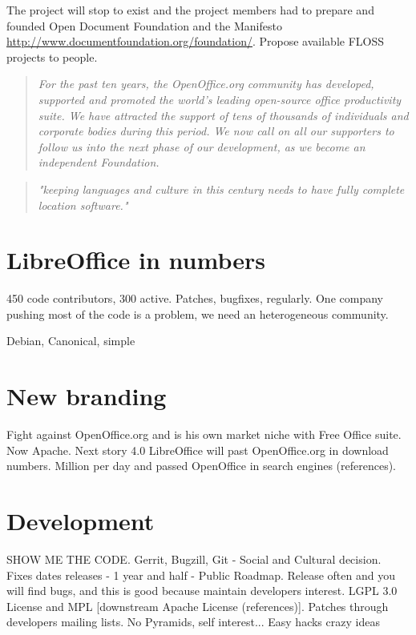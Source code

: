 \documentclass[11pt]{scrartcl}
\begin{document}
The project will stop to exist and the project members had to prepare and founded Open Document Foundation and the Manifesto \url{http://www.documentfoundation.org/foundation/}. Propose available FLOSS projects to people.

\begin{quotation}
    \emph{For the past ten years, the OpenOffice.org community has developed, supported and promoted the world's leading open-source office productivity suite. We have attracted the support of tens of thousands of individuals and corporate bodies during this period. We now call on all our supporters to follow us into the next phase of our development, as we become an independent Foundation.}
\end{quotation}

\begin{quotation}
    \emph{"keeping languages and culture in this century needs to have fully complete location software."}
\end{quotation}


\section{LibreOffice in numbers}
\label{sec:numbers}

450 code contributors, 300 active. Patches, bugfixes, regularly.
One company pushing most of the code is a problem, we need an heterogeneous community. 

Debian, Canonical, simple


\section{New branding}
\label{sec:brand-awareness}

Fight against OpenOffice.org and is his own market niche with Free Office suite. Now Apache.
Next story 4.0 LibreOffice will past OpenOffice.org in download numbers. Million per day and passed OpenOffice in search engines (references).


\section{Development}
\label{sec:development}

SHOW ME THE CODE.
Gerrit, Bugzill, Git - Social and Cultural decision.
Fixes dates releases - 1 year and half - Public Roadmap. Release often and you will find bugs, and this is good because maintain developers interest.
LGPL 3.0 License and MPL [downstream Apache License (references)].
Patches through developers mailing lists.
No Pyramids, self interest... 
Easy hacks %
crazy ideas %
\end{document}
